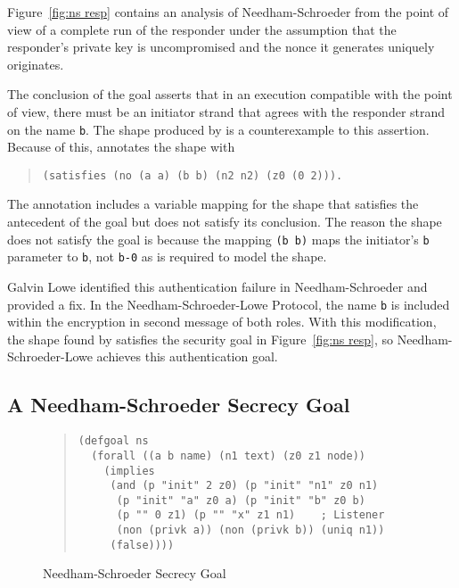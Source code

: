 \documentclass[12pt]{article}
\begin{document}
Figure~\ref{fig:ns resp} contains an analysis of Needham-Schroeder
from the point of view of a complete run of the responder under the
assumption that the responder's private key is uncompromised and the
nonce it generates uniquely originates.

The conclusion of the goal asserts that in an execution compatible
with the point of view, there must be an initiator strand that agrees
with the responder strand on the name \texttt{b}.  The shape produced
by {\cpsa} is a counterexample to this assertion.  Because of this,
{\cpsa} annotates the shape with
\begin{quote}
\begin{verbatim}
(satisfies (no (a a) (b b) (n2 n2) (z0 (0 2))).
\end{verbatim}
\end{quote}
The annotation includes a variable mapping for the shape that
satisfies the antecedent of the goal but does not satisfy its
conclusion.  The reason the shape does not satisfy the goal is because
the mapping \texttt{(b b)} maps the initiator's \texttt{b} parameter
to \texttt{b}, not \texttt{b-0} as is required to model the shape.

Galvin Lowe identified this authentication failure in
Needham-Schroeder and provided a fix.  In the Needham-Schroeder-Lowe
Protocol, the name \texttt{b} is included within the encryption in second
message of both roles.  With this modification, the shape found by
{\cpsa} satisfies the security goal in Figure~\ref{fig:ns resp}, so
Needham-Schroeder-Lowe achieves this authentication goal.

\subsection{A Needham-Schroeder Secrecy Goal}\label{sec:secrecy goal}

\begin{figure}
\begin{quote}
\begin{verbatim}
(defgoal ns
  (forall ((a b name) (n1 text) (z0 z1 node))
    (implies
     (and (p "init" 2 z0) (p "init" "n1" z0 n1)
      (p "init" "a" z0 a) (p "init" "b" z0 b)
      (p "" 0 z1) (p "" "x" z1 n1)    ; Listener
      (non (privk a)) (non (privk b)) (uniq n1))
     (false))))
\end{verbatim}
\end{quote}
\caption{Needham-Schroeder Secrecy Goal}\label{fig:ns secrecy}
\end{figure}
\end{document}
